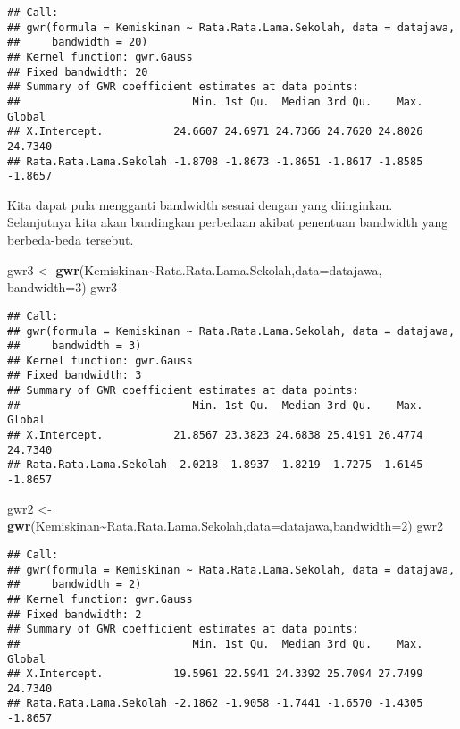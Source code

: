 \documentclass[
]{book}
\newenvironment{Shaded}{\begin{snugshade}}{\end{snugshade}}
\newcommand{\DataTypeTok}[1]{\textcolor[rgb]{0.13,0.29,0.53}{#1}}
\newcommand{\DecValTok}[1]{\textcolor[rgb]{0.00,0.00,0.81}{#1}}
\newcommand{\KeywordTok}[1]{\textcolor[rgb]{0.13,0.29,0.53}{\textbf{#1}}}
\newcommand{\NormalTok}[1]{#1}
\newcommand{\OperatorTok}[1]{\textcolor[rgb]{0.81,0.36,0.00}{\textbf{#1}}}
\newcommand{\StringTok}[1]{\textcolor[rgb]{0.31,0.60,0.02}{#1}}
\begin{document}
\begin{verbatim}
## Call:
## gwr(formula = Kemiskinan ~ Rata.Rata.Lama.Sekolah, data = datajawa, 
##     bandwidth = 20)
## Kernel function: gwr.Gauss 
## Fixed bandwidth: 20 
## Summary of GWR coefficient estimates at data points:
##                           Min. 1st Qu.  Median 3rd Qu.    Max.  Global
## X.Intercept.           24.6607 24.6971 24.7366 24.7620 24.8026 24.7340
## Rata.Rata.Lama.Sekolah -1.8708 -1.8673 -1.8651 -1.8617 -1.8585 -1.8657
\end{verbatim}

Kita dapat pula mengganti bandwidth sesuai dengan yang diinginkan. Selanjutnya kita akan bandingkan perbedaan akibat penentuan bandwidth yang berbeda-beda tersebut.

\begin{Shaded}
\begin{Highlighting}[]
\NormalTok{gwr3 \textless{}{-}}\StringTok{ }\KeywordTok{gwr}\NormalTok{(Kemiskinan}\OperatorTok{\textasciitilde{}}\NormalTok{Rata.Rata.Lama.Sekolah,}\DataTypeTok{data=}\NormalTok{datajawa, }\DataTypeTok{bandwidth=}\DecValTok{3}\NormalTok{)}
\NormalTok{gwr3}
\end{Highlighting}
\end{Shaded}

\begin{verbatim}
## Call:
## gwr(formula = Kemiskinan ~ Rata.Rata.Lama.Sekolah, data = datajawa, 
##     bandwidth = 3)
## Kernel function: gwr.Gauss 
## Fixed bandwidth: 3 
## Summary of GWR coefficient estimates at data points:
##                           Min. 1st Qu.  Median 3rd Qu.    Max.  Global
## X.Intercept.           21.8567 23.3823 24.6838 25.4191 26.4774 24.7340
## Rata.Rata.Lama.Sekolah -2.0218 -1.8937 -1.8219 -1.7275 -1.6145 -1.8657
\end{verbatim}

\begin{Shaded}
\begin{Highlighting}[]
\NormalTok{gwr2 \textless{}{-}}\StringTok{ }\KeywordTok{gwr}\NormalTok{(Kemiskinan}\OperatorTok{\textasciitilde{}}\NormalTok{Rata.Rata.Lama.Sekolah,}\DataTypeTok{data=}\NormalTok{datajawa,}\DataTypeTok{bandwidth=}\DecValTok{2}\NormalTok{)}
\NormalTok{gwr2}
\end{Highlighting}
\end{Shaded}

\begin{verbatim}
## Call:
## gwr(formula = Kemiskinan ~ Rata.Rata.Lama.Sekolah, data = datajawa, 
##     bandwidth = 2)
## Kernel function: gwr.Gauss 
## Fixed bandwidth: 2 
## Summary of GWR coefficient estimates at data points:
##                           Min. 1st Qu.  Median 3rd Qu.    Max.  Global
## X.Intercept.           19.5961 22.5941 24.3392 25.7094 27.7499 24.7340
## Rata.Rata.Lama.Sekolah -2.1862 -1.9058 -1.7441 -1.6570 -1.4305 -1.8657
\end{verbatim}
\end{document}
